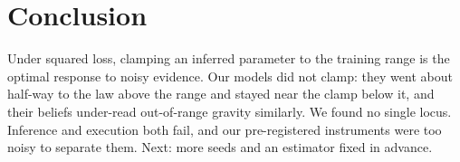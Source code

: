 \section{Conclusion}

Under squared loss, clamping an inferred parameter to the training range is the optimal response to
noisy evidence. Our models did not clamp: they went about half-way to the law above the range and
stayed near the clamp below it, and their beliefs under-read out-of-range gravity similarly. We
found no single locus. Inference and execution both fail, and our pre-registered instruments were
too noisy to separate them. Next: more seeds and an estimator fixed in advance.
